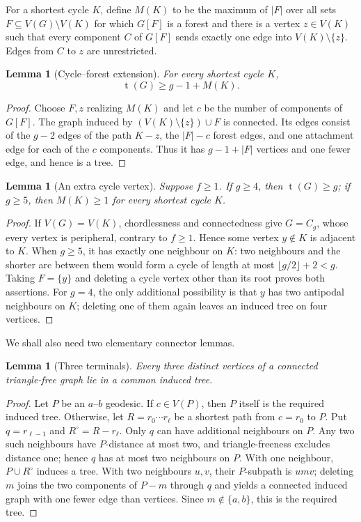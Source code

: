 \documentclass[11pt]{article}
\numberwithin{equation}{section}
\newtheorem{lemma}[theorem]{Lemma}
\theoremstyle{remark}
\newcommand{\tr}{\operatorname{t}}
\begin{document}
For a shortest cycle $K$, define $M(K)$ to be the maximum of $|F|$ over all
sets $F\subseteq V(G)\setminus V(K)$ for which $G[F]$ is a forest and there
is a vertex $z\in V(K)$ such that every component $C$ of $G[F]$ sends
exactly one edge into $V(K)\setminus\{z\}$.  Edges from $C$ to $z$ are
unrestricted.

\begin{lemma}[Cycle--forest extension]\label{w142-lem:cycle-forest}
For every shortest cycle $K$,
\[
  \tr(G)\ge g-1+M(K).
\]
\end{lemma}

\begin{proof}
Choose $F,z$ realizing $M(K)$ and let $c$ be the number of components of
$G[F]$.  The graph induced by
$(V(K)\setminus\{z\})\cup F$ is connected.  Its edges consist of the $g-2$
edges of the path $K-z$, the $|F|-c$ forest edges, and one attachment edge
for each of the $c$ components.  Thus it has $g-1+|F|$ vertices and one
fewer edge, and hence is a tree.
\end{proof}

\begin{lemma}[An extra cycle vertex]\label{w142-lem:extra}
Suppose $f\ge1$.  If $g\ge4$, then $\tr(G)\ge g$; if $g\ge5$, then
$M(K)\ge1$ for every shortest cycle $K$.
\end{lemma}

\begin{proof}
If $V(G)=V(K)$, chordlessness and connectedness give $G=C_g$, whose every
vertex is peripheral, contrary to $f\ge1$.  Hence some vertex $y\notin K$
is adjacent to $K$.  When $g\ge5$, it has exactly one neighbour on $K$:
two neighbours and the shorter arc between them would form a cycle of
length at most $\lfloor g/2\rfloor+2<g$.  Taking $F=\{y\}$ and deleting a
cycle vertex other than its root proves both assertions.  For $g=4$, the
only additional possibility is that $y$ has two antipodal neighbours on
$K$; deleting one of them again leaves an induced tree on four vertices.
\end{proof}

We shall also need two elementary connector lemmas.

\begin{lemma}[Three terminals]\label{w142-lem:three-tree}
Every three distinct vertices of a connected triangle-free graph lie in a
common induced tree.
\end{lemma}

\begin{proof}
Let $P$ be an $a$--$b$ geodesic.  If $c\in V(P)$, then $P$ itself is the
required induced tree.  Otherwise, let $R=r_0\cdots r_\ell$ be a shortest
path from $c=r_0$ to $P$.  Put $q=r_{\ell-1}$ and
$R^\circ=R-r_\ell$.  Only $q$ can have additional neighbours on $P$.
Any two such neighbours have $P$-distance at most two, and triangle-freeness
excludes distance one; hence $q$ has at most two neighbours on $P$.
With one neighbour, $P\cup R^\circ$ induces a tree.  With two neighbours
$u,v$, their $P$-subpath is $u m v$; deleting $m$ joins the two components
of $P-m$ through $q$ and yields a connected induced graph with one fewer
edge than vertices.  Since $m\notin\{a,b\}$, this is the required tree.
\end{proof}
\end{document}
